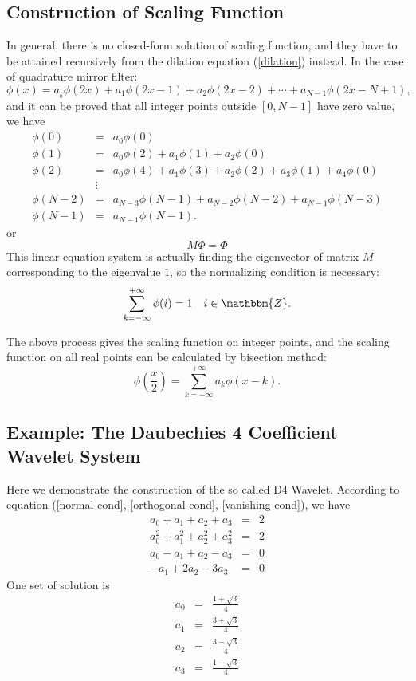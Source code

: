 \documentclass{book}
\begin{document}
\subsection{Construction of Scaling Function}

In general, there is no closed-form solution of scaling function, and they
have to be attained recursively from the dilation equation (\ref{dilation})
instead. In the case of quadrature mirror filter:
\[ \phi (x) = a_{_0} \phi (2 x) + a_1 \phi (2 x - 1) + a_2 \phi (2 x - 2) +
   \cdots + a_{N - 1} \phi (2 x - N + 1), \]
and it can be proved that{\cite{williams1994introduction}} all integer points
outside $[0, N - 1]$ have zero value, we have
\begin{eqnarray*}
  \phi (0) & = & a_0 \phi (0)\\
  \phi (1) & = & a_0 \phi (2) + a_1 \phi (1) + a_2 \phi (0)\\
  \phi (2) & = & a_0 \phi (4) + a_1 \phi (3) + a_2 \phi (2) + a_3 \phi (1) +
  a_4 \phi (0)\\
  & \vdots & \\
  \phi (N - 2) & = & a_{N - 3} \phi (N - 1) + a_{N - 2} \phi (N - 2) + a_{N -
  1} \phi (N - 3)\\
  \phi (N - 1) & = & a_{N - 1} \phi (N - 1) .
\end{eqnarray*}
or
\[ M \Phi = \Phi \]
This linear equation system is actually finding the eigenvector of matrix $M$
corresponding to the eigenvalue $1$, so the normalizing condition is
necessary:
\[ \sum_{k = - \infty}^{+ \infty} \phi (i) = 1 \quad i \in \mathbbm{Z}. \]


The above process gives the scaling function on integer points, and the
scaling function on all real points can be calculated by bisection method:
\[ \phi \left( \frac{x}{2} \right) = \sum_{k = - \infty}^{+ \infty} a_k \phi
   (x - k) . \]

\subsection{Example: The Daubechies 4 Coefficient Wavelet System}

Here we demonstrate the construction of the so called D4 Wavelet. According to
equation (\ref{normal-cond}, \ref{orthogonal-cond}, \ref{vanishing-cond}), we
have
\begin{eqnarray*}
  a_0 + a_1 + a_2 + a_3 & = & 2\\
  a_0^2 + a_1^2 + a_2^2 + a_3^2 & = & 2\\
  a_0 - a_1 + a_2 - a_3 & = & 0\\
  - a_1 + 2 a_2 - 3 a_3 & = & 0
\end{eqnarray*}
One set of solution is \begin{eqnarray*}
  a_0 & = & \frac{1 + \sqrt{3}}{4}\\
  a_1 & = & \frac{3 + \sqrt{3}}{4}\\
  a_2 & = & \frac{3 - \sqrt{3}}{4}\\
  a_3 & = & \frac{1 - \sqrt{3}}{4}
\end{eqnarray*}
\end{document}
